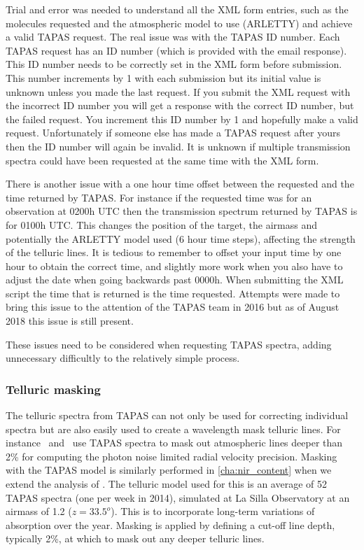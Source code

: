 Trial and error was needed to understand all the {XML} form entries, such as the molecules requested and the atmospheric model to use ({ARLETTY}) and achieve a valid {TAPAS} request. The real issue was with the {TAPAS} {{ID}} number. Each {TAPAS} request has an {ID} number (which is provided with the email response). This {ID} number needs to be correctly set in the {XML} form before submission. This number increments by 1 with each submission but its initial value is unknown unless you made the last request. If you submit the {XML} request with the incorrect {ID} number you will get a response with the correct {ID} number, but the failed request. You increment this {ID} number by 1 and hopefully make a valid request. Unfortunately if someone else has made a {TAPAS} request after yours then the {ID} number will again be invalid. It is unknown if multiple transmission spectra could have been requested at the same time with the {XML} form.

There is another issue with a one hour time offset between the requested and the time returned by {TAPAS}. For instance if the requested time was for an observation at 0200h {UTC} then the transmission spectrum returned by {TAPAS} is for 0100h {UTC}. This changes the position of the target, the airmass and potentially the {ARLETTY} model used (6 hour time steps), affecting the strength of the telluric lines. It is tedious to remember to offset your input time by one hour to obtain the correct time, and slightly more work when you also have to adjust the date when going backwards past 0000h. When submitting the {XML} script the time that is returned is the time requested. Attempts were made to bring this issue to the attention of the {TAPAS} team in 2016 but as of August 2018 this issue is still present.

These issues need to be considered when requesting {TAPAS} spectra, adding unnecessary difficultly to the relatively simple process.


\subsubsection{Telluric masking}
The telluric spectra from {TAPAS} can not only be used for correcting individual spectra but are also easily used to create a wavelength mask telluric lines. For instance~\citet{figueira_radial_2016} and~\citet{artigau_optical_2018} use {TAPAS} spectra to mask out atmospheric lines deeper than 2\% for computing the photon noise limited radial velocity precision. Masking with the {TAPAS} model is similarly performed in \cref{cha:nir_content} when we extend the analysis of \citet{figueira_radial_2016}. The telluric model used for this is an average of 52 {TAPAS} spectra (one per week in 2014), simulated at La Silla Observatory at an airmass of 1.2 (\(z = 33.5^{o}\)). This is to incorporate long-term variations of absorption over the year.
Masking is applied by defining a cut-off line depth, typically 2\%, at which to mask out any deeper telluric lines.


